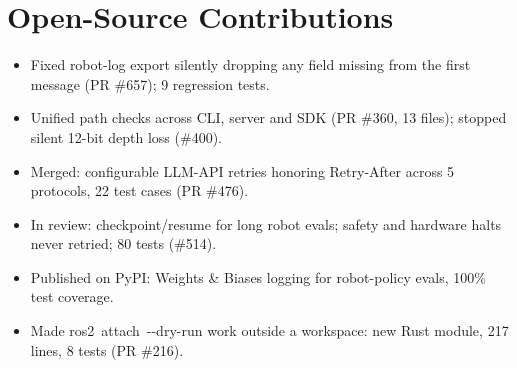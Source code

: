 \documentclass[10pt]{article}
\begin{document}
\section{Open-Source Contributions}
\begin{itemize}
\item Fixed robot-log export silently dropping any field missing from the first message (PR \#657); 9 regression tests.
\item Unified path checks across CLI, server and SDK (PR \#360, 13 files); stopped silent 12-bit depth loss (\#400).
\end{itemize}
\begin{itemize}
\item Merged: configurable LLM-API retries honoring Retry-After across 5 protocols, 22 test cases (PR \#476).
\item In review: checkpoint/resume for long robot evals; safety and hardware halts never retried; 80 tests (\#514).
\item Published  on PyPI: Weights \& Biases logging for robot-policy evals, 100\% test coverage.
\end{itemize}
\begin{itemize}
\item Made \mbox{ros2 attach -{}-dry-run} work outside a workspace: new Rust module, 217 lines, 8 tests (PR \#216).
\end{itemize}
\end{document}
